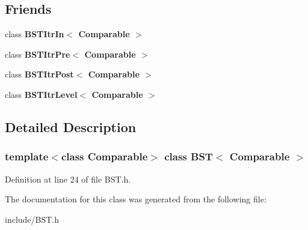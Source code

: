\subsection*{Friends}
\begin{DoxyCompactItemize}
\item 
\mbox{\label{classBST_aab3993acac2ab24a0b59edb0c3acc775}} 
class {\bfseries B\+S\+T\+Itr\+In$<$ Comparable $>$}
\item 
\mbox{\label{classBST_a45a55df6f11541416d4ea7684c575c1a}} 
class {\bfseries B\+S\+T\+Itr\+Pre$<$ Comparable $>$}
\item 
\mbox{\label{classBST_a5dc153694be266f6e772659486219da7}} 
class {\bfseries B\+S\+T\+Itr\+Post$<$ Comparable $>$}
\item 
\mbox{\label{classBST_a26ff00bc0d87069aed877f10fd3c80a8}} 
class {\bfseries B\+S\+T\+Itr\+Level$<$ Comparable $>$}
\end{DoxyCompactItemize}


\subsection{Detailed Description}
\subsubsection*{template$<$class Comparable$>$\newline
class B\+S\+T$<$ Comparable $>$}



Definition at line 24 of file B\+S\+T.\+h.



The documentation for this class was generated from the following file\+:\begin{DoxyCompactItemize}
\item 
include/B\+S\+T.\+h\end{DoxyCompactItemize}
